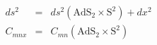 \begin{equation}
\begin{array}{rcl}
ds^2 & = & ds^2(\mathrm{AdS}_2\times\mathrm{S}^2) + dx^2 \\
C_{mnx} & = & C_{mn}(\mathrm{AdS}_2\times\mathrm{S}^2)
\end{array}
\end{equation}

